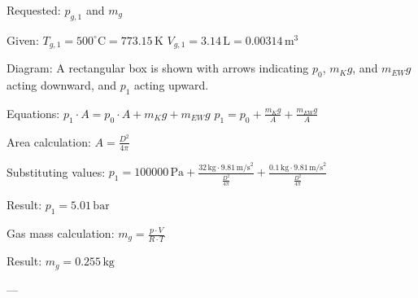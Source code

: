 Requested: \( p_{g,1} \) and \( m_g \)  

Given:  
\( T_{g,1} = 500^\circ \text{C} = 773.15 \, \text{K} \)  
\( V_{g,1} = 3.14 \, \text{L} = 0.00314 \, \text{m}^3 \)  

Diagram: A rectangular box is shown with arrows indicating \( p_0 \), \( m_K g \), and \( m_{EW} g \) acting downward, and \( p_1 \) acting upward.  

Equations:  
\( p_1 \cdot A = p_0 \cdot A + m_K g + m_{EW} g \)  
\( p_1 = p_0 + \frac{m_K g}{A} + \frac{m_{EW} g}{A} \)  

Area calculation:  
\( A = \frac{D^2}{4 \pi} \)  

Substituting values:  
\( p_1 = 100000 \, \text{Pa} + \frac{32 \, \text{kg} \cdot 9.81 \, \text{m/s}^2}{\frac{D^2}{4 \pi}} + \frac{0.1 \, \text{kg} \cdot 9.81 \, \text{m/s}^2}{\frac{D^2}{4 \pi}} \)  

Result:  
\( p_1 = 5.01 \, \text{bar} \)  

Gas mass calculation:  
\( m_g = \frac{p \cdot V}{R \cdot T} \)  

Result:  
\( m_g = 0.255 \, \text{kg} \)  

---